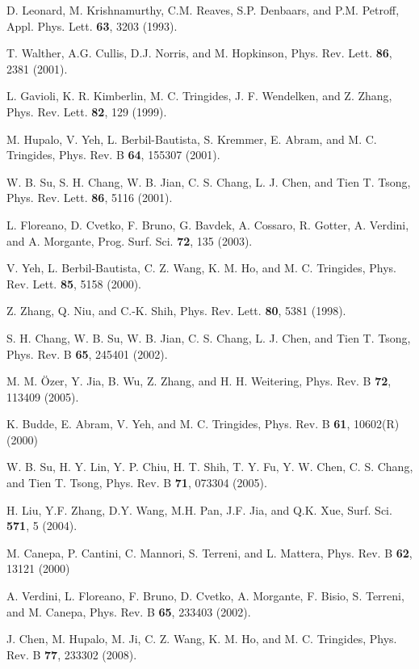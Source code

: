 \documentclass[aps,prl,showpacs,twocolumn,byrevtex,floatfix]{revtex4-1}
\begin{document}
\begin{thebibliography}{99}
D. Leonard, M. Krishnamurthy, C.M. Reaves, S.P. Denbaars, and P.M. Petroff,
Appl. Phys. Lett. {\bf 63}, 3203 (1993).

T. Walther, A.G. Cullis, D.J. Norris, and M. Hopkinson, Phys. Rev. Lett. {\bf
86}, 2381 (2001).

L. Gavioli, K. R. Kimberlin, M. C. Tringides, J. F. Wendelken, and Z. Zhang,
Phys. Rev. Lett. {\bf 82}, 129 (1999).

M. Hupalo, V. Yeh, L. Berbil-Bautista, S. Kremmer, E. Abram, and M. C.
Tringides, Phys. Rev. B {\bf 64}, 155307 (2001).

W. B. Su, S. H. Chang, W. B. Jian, C. S. Chang, L. J. Chen, and Tien T. Tsong,
Phys. Rev. Lett. {\bf 86}, 5116 (2001).

L. Floreano, D. Cvetko, F. Bruno, G. Bavdek, A. Cossaro, R. Gotter, A. Verdini,
and A. Morgante, Prog. Surf. Sci. {\bf 72}, 135 (2003).

V. Yeh, L. Berbil-Bautista, C. Z. Wang, K. M. Ho, and M. C. Tringides, Phys.
Rev. Lett. {\bf 85}, 5158 (2000).

Z. Zhang, Q. Niu, and C.-K. Shih, Phys. Rev. Lett. {\bf 80}, 5381 (1998).

S. H. Chang, W. B. Su, W. B. Jian, C. S. Chang, L. J. Chen, and Tien T. Tsong,
Phys. Rev. B {\bf 65}, 245401 (2002).

M. M. \"Ozer, Y. Jia, B. Wu, Z. Zhang, and H. H. Weitering, Phys. Rev. B {\bf
72}, 113409 (2005).

K. Budde, E. Abram, V. Yeh, and M. C. Tringides, Phys. Rev. B {\bf 61},
10602(R) (2000)

W. B. Su, H. Y. Lin, Y. P. Chiu, H. T. Shih, T. Y. Fu, Y. W. Chen, C. S. Chang,
and Tien T. Tsong, Phys. Rev. B {\bf 71}, 073304 (2005).

H. Liu, Y.F. Zhang, D.Y. Wang, M.H. Pan, J.F. Jia, and Q.K. Xue, Surf. Sci.
{\bf 571}, 5 (2004).

M. Canepa, P. Cantini, C. Mannori, S. Terreni, and L. Mattera, Phys. Rev. B
{\bf 62}, 13121 (2000)

A. Verdini, L. Floreano, F. Bruno, D. Cvetko, A. Morgante, F. Bisio, S. Terreni,
and M. Canepa, Phys. Rev. B {\bf 65}, 233403 (2002).

J. Chen, M. Hupalo, M. Ji, C. Z. Wang, K. M. Ho, and M. C. Tringides, Phys.
Rev. B {\bf 77}, 233302 (2008).


\end{thebibliography}
\end{document}
